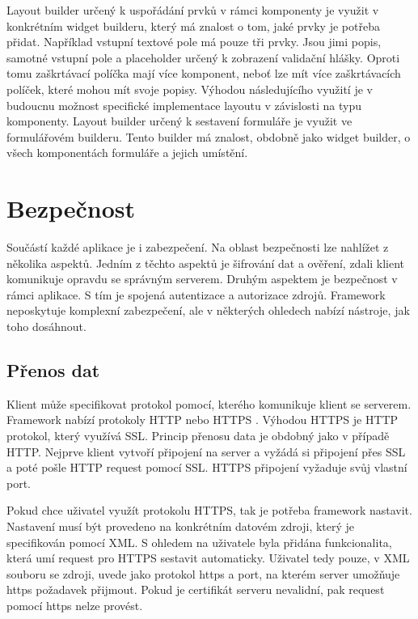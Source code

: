 Layout builder určený k uspořádání prvků v rámci komponenty je využit v konkrétním widget builderu, který má znalost o tom, jaké prvky je potřeba přidat. Například vstupní textové pole má pouze tři prvky. Jsou jimi popis, samotné vstupní pole a placeholder určený k zobrazení validační hlášky. Oproti tomu zaškrtávací políčka mají více komponent, neboť lze mít více zaškrtávacích políček, které mohou mít svoje popisy. Výhodou následujícího využití je v budoucnu možnost specifické implementace layoutu v závislosti na typu komponenty. Layout builder určený k sestavení formuláře je využit ve formulářovém builderu. Tento builder má znalost, obdobně jako widget builder, o všech komponentách formuláře a jejich umístění. 

\section{Bezpečnost}
Součástí každé aplikace je i zabezpečení. Na oblast bezpečnosti lze nahlížet z několika aspektů. Jedním z těchto aspektů je šifrování dat a ověření, zdali klient komunikuje opravdu se správným serverem. Druhým aspektem je bezpečnost v rámci aplikace. S tím je spojená autentizace a autorizace zdrojů. Framework neposkytuje komplexní zabezpečení, ale v některých ohledech nabízí nástroje, jak toho dosáhnout.

\subsection{Přenos dat}
Klient může specifikovat protokol pomocí, kterého komunikuje klient se serverem. Framework nabízí protokoly HTTP nebo HTTPS \cite{https}. Výhodou HTTPS je HTTP protokol, který využívá SSL. Princip přenosu data je obdobný jako v případě HTTP. Nejprve klient vytvoří připojení na server a vyžádá si připojení přes SSL a poté pošle HTTP request pomocí SSL. HTTPS připojení vyžaduje svůj vlastní port. 

Pokud chce uživatel využít protokolu HTTPS, tak je potřeba framework nastavit. Nastavení musí být provedeno na konkrétním datovém zdroji, který je specifikován pomocí XML. S ohledem na uživatele byla přidána funkcionalita, která umí request pro HTTPS sestavit automaticky. Uživatel tedy pouze, v XML souboru se zdroji, uvede jako protokol https a port, na kterém server umožňuje https požadavek přijmout. Pokud je certifikát serveru nevalidní, pak request pomocí https nelze provést.


